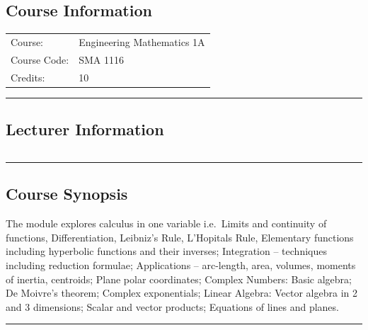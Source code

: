 
\subsection*{Course Information}\label{course:sma3116}
\vspace{0ex}%
\noindent\parbox{0.5\textwidth}{%
    \noindent\begin{tabular}{@{}ll}
                 \textsf{Course:}          & 	Engineering Mathematics 1A \\
                 \textsf{Course Code:}         & 	SMA 1116    \\
                 \textsf{Credits:}    & 	10
    \end{tabular}}
\vspace{2ex}\hrule\vspace{2ex}

\subsection*{Lecturer Information}
\noindent\parbox{0.5\textwidth}{%
    \noindent\begin{tabular}{@{}ll}
                 
    \end{tabular}}
\vspace{2ex}\hrule\vspace{2ex}


\subsection*{Course Synopsis}
The module explores calculus in one variable i.e.\ Limits and continuity of functions, Differentiation,
Leibniz’s Rule, L’Hopitals Rule, Elementary functions including hyperbolic functions and their
inverses; Integration – techniques including reduction formulae; Applications – arc-length, area,
volumes, moments of inertia, centroids; Plane polar coordinates; Complex Numbers: Basic algebra; De
Moivre’s theorem; Complex exponentials; Linear Algebra: Vector algebra in 2 and 3 dimensions; Scalar
and vector products; Equations of lines and planes.
\vspace{2ex} \hrule\vspace{2ex}

